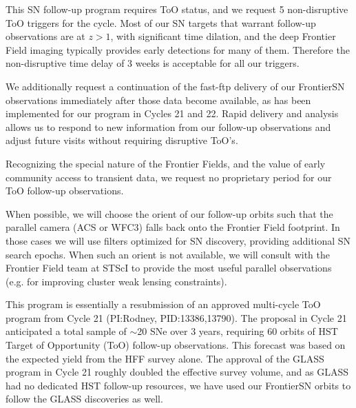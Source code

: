 \documentclass[12pt]{article}
\begin{document}
%
%
\specialreq             %


This SN follow-up program requires ToO status, and we request 5
non-disruptive ToO triggers for the cycle.  Most of our SN targets
that warrant follow-up observations are at $z>1$, with significant
time dilation, and the deep Frontier Field imaging typically provides
early detections for many of them.  Therefore the non-disruptive time
delay of 3 weeks is acceptable for all our triggers.

We additionally request a continuation of the fast-ftp delivery of our
FrontierSN observations immediately after those data become available,
as has been implemented for our program in Cycles 21 and 22.  Rapid
delivery and analysis allows us to respond to new information from our
follow-up observations and adjust future visits without requiring
disruptive ToO's.

Recognizing the special nature of the Frontier Fields, and the value
of early community access to transient data, we request no proprietary
period for our ToO follow-up observations.



%
%
\coordinatedobs          %


When possible, we will choose the orient of our follow-up orbits such
that the parallel camera (ACS or WFC3) falls back onto the Frontier
Field footprint.  In those cases we will use filters optimized for SN
discovery, providing additional SN search epochs.  When such an orient
is not available, we will consult with the Frontier Field team at
STScI to provide the most useful parallel observations (e.g. for
improving cluster weak lensing constraints).



%
%
\duplications           %

This program is essentially a resubmission of an approved multi-cycle
ToO program from Cycle 21 (PI:Rodney, PID:13386,13790). The proposal
in Cycle 21 anticipated a total sample of $\sim$20 SNe over 3 years,
requiring 60 orbits of HST Target of Opportunity (ToO) follow-up
observations.  This forecast was based on the expected yield from the
HFF survey alone.  The approval of the GLASS program in Cycle 21
roughly doubled the effective survey volume, and as GLASS had no
dedicated HST follow-up resources, we have used our FrontierSN orbits
to follow the GLASS discoveries as well.
\end{document}

